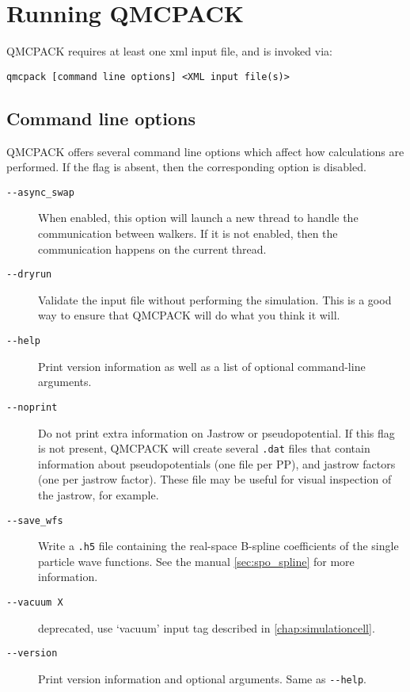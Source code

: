\chapter{Running QMCPACK}
\label{chap:running}

QMCPACK requires at least one xml input file, and is invoked via:

{\texttt{qmcpack [command line options] <XML input file(s)>}}

\section{Command line options}
\label{sec:commandline}
QMCPACK offers several command line options which affect how calculations
are performed. If the flag is absent, then the corresponding
option is disabled.

\begin{description}
\item[\texttt{-{}-async\_swap}]{ When enabled, this option will launch a new thread
  to handle the communication between walkers. If it is not enabled,
  then the communication happens on the current thread. }
\item[\texttt{-{}-dryrun}]{ Validate the input file without performing the simulation.
  This is a good way to ensure that QMCPACK will do what you think it will. }
\item[\texttt{-{}-help}]{ Print version information as well as a list of optional
  command-line arguments. }
\item[\texttt{-{}-noprint}]{ Do not print extra information on Jastrow or pseudopotential.
  If this flag is not present, QMCPACK will create several \texttt{.dat} files
  that contain information about pseudopotentials (one file per PP), and jastrow
  factors (one per jastrow factor). These file may be useful for visual inspection
  of the jastrow, for example. }
\item[\texttt{-{}-save\_wfs}]{ Write a \texttt{.h5} file containing the real-space B-spline
  coefficients of the single particle wave functions. See the manual
  \ref{sec:spo_spline} for more information.}
\item[\texttt{-{}-vacuum X}]{deprecated, use `vacuum' input tag described in \ref{chap:simulationcell}. }
\item[\texttt{-{}-version}]{ Print version information and optional arguments.
  Same as \texttt{-{}-help}. }
\end{description}




